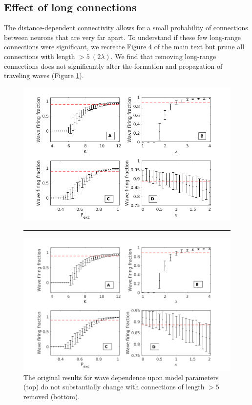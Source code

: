 \documentclass[12pt]{article}
\begin{document}
\subsection*{Effect of long connections}
\color{red}
The distance-dependent connectivity allows for a small probability of connections between neurons that are very far apart.
To understand if these few long-range connections were significant, we recreate Figure 4 of the main text but prune all connections with length $>5\ (2\lambda)$.
We find that removing long-range connections does not significantly alter the formation and propagation of traveling waves (Figure \ref{fig:wave_parameters_nolongconnections}).
\begin{figure}[!htb]
 \centering
 \includegraphics[width=\textwidth]{fig/ParamWaveSim} 
 \rule{\textwidth}{1bp}
 \includegraphics[width=\textwidth]{fig/ParamWaveSim_NoLongConnections}
 \caption{The original results for wave dependence upon model parameters (top) do not substantially change with connections of length $>5$ removed (bottom). }
 \label{fig:wave_parameters_nolongconnections}
\end{figure}
\FloatBarrier
\end{document}
